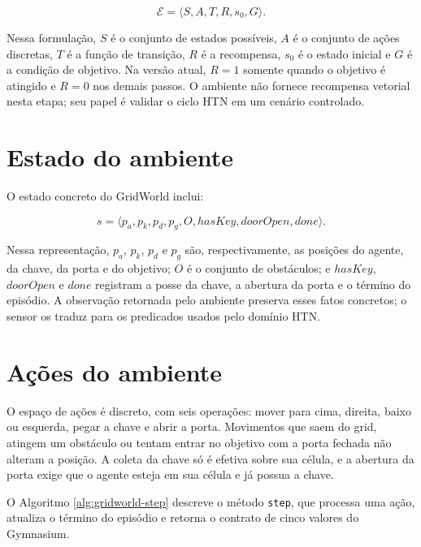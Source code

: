 \begin{equation}
\mathcal{E} = \langle S,A,T,R,s_0,G \rangle.
\end{equation}

Nessa formulação, $S$ é o conjunto de estados possíveis, $A$ é o conjunto de
ações discretas, $T$ é a função de transição, $R$ é a recompensa, $s_0$ é o
estado inicial e $G$ é a condição de objetivo. Na versão atual, $R=1$ somente
quando o objetivo é atingido e $R=0$ nos demais passos. O ambiente não fornece
recompensa vetorial nesta etapa; seu papel é validar o ciclo HTN em um cenário
controlado.

\section{Estado do ambiente}

O estado concreto do GridWorld inclui:

\begin{equation}
s =
\langle
p_a,
p_k,
p_d,
p_g,
O,
hasKey,
doorOpen,
done
\rangle.
\end{equation}

Nessa representação, $p_a$, $p_k$, $p_d$ e $p_g$ são, respectivamente, as
posições do agente, da chave, da porta e do objetivo; $O$ é o conjunto de
obstáculos; e $hasKey$, $doorOpen$ e $done$ registram a posse da chave, a
abertura da porta e o término do episódio. A observação retornada pelo ambiente
preserva esses fatos concretos; o sensor os traduz para os predicados usados
pelo domínio HTN.

\section{Ações do ambiente}

O espaço de ações é discreto, com seis operações: mover para cima, direita,
baixo ou esquerda, pegar a chave e abrir a porta. Movimentos que saem do grid,
atingem um obstáculo ou tentam entrar no objetivo com a porta fechada não
alteram a posição. A coleta da chave só é efetiva sobre sua célula, e a abertura
da porta exige que o agente esteja em sua célula e já possua a chave.

O Algoritmo \ref{alg:gridworld-step} descreve o método \texttt{step}, que
processa uma ação, atualiza o término do episódio e retorna o contrato de cinco
valores do Gymnasium.

